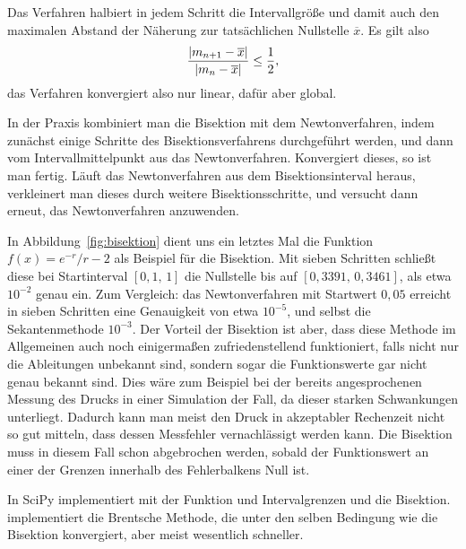 Das Verfahren halbiert in jedem Schritt die Intervallgröße und damit
auch den maximalen Abstand der Näherung zur tatsächlichen
Nullstelle $\overline{x}$. Es gilt also
\begin{equation}
  \frac{\left\lvert{m_{n+1} - \overline{x}}\right\rvert}{\left\lvert{m_{n} - \overline{x}}\right\rvert}\le \frac{1}{2},
\end{equation}
das Verfahren konvergiert also nur linear, dafür aber global.

In der Praxis kombiniert man die Bisektion mit dem Newtonverfahren, indem
zunächst einige Schritte des Bisektionsverfahrens durchgeführt
werden, und dann vom Intervallmittelpunkt aus das
Newtonverfahren. Konvergiert dieses, so ist man fertig. Läuft das
Newtonverfahren aus dem Bisektionsinterval heraus,
verkleinert man dieses durch weitere Bisektionsschritte, und versucht dann
erneut, das Newtonverfahren anzuwenden.

In Abbildung~\ref{fig:bisektion} dient uns ein letztes Mal die
Funktion $f(x) = e^{-r}/r - 2$ als Beispiel für die Bisektion. Mit
sieben Schritten schließt diese bei Startinterval $[0,1,\,1]$ die
Nullstelle bis auf $[0,3391,\,0,3461]$, als etwa $10^{-2}$ genau
ein. Zum Vergleich: das Newtonverfahren mit Startwert $0,05$ erreicht
in sieben Schritten eine Genauigkeit von etwa $10^{-5}$, und selbst
die Sekantenmethode $10^{-3}$.
Der Vorteil der Bisektion ist aber, dass diese Methode im Allgemeinen
auch noch einigermaßen zufriedenstellend funktioniert, falls nicht nur
die Ableitungen unbekannt sind, sondern sogar die Funktionswerte gar
nicht genau bekannt sind. Dies wäre zum Beispiel bei der bereits
angesprochenen Messung des Drucks in einer Simulation der Fall, da
dieser starken Schwankungen unterliegt. Dadurch kann man meist den
Druck in akzeptabler Rechenzeit nicht so gut mitteln, dass dessen
Messfehler vernachlässigt werden kann. Die Bisektion muss in diesem
Fall schon abgebrochen werden, sobald der Funktionswert an einer der
Grenzen innerhalb des Fehlerbalkens Null ist.

In SciPy implementiert  mit der
Funktion  und Intervalgrenzen  und  die
Bisektion.  implementiert die
Brentsche Methode, die unter den selben Bedingung wie die Bisektion
konvergiert, aber meist wesentlich schneller.

